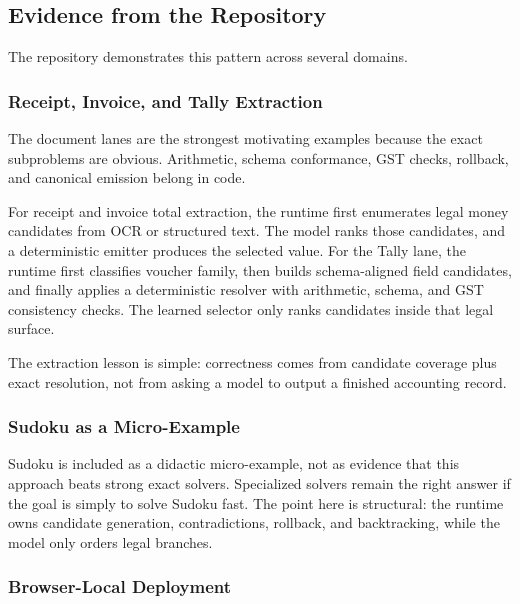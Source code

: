 \documentclass[
]{article}
\begin{document}
\subsection{Evidence from the
Repository}\label{evidence-from-the-repository}

The repository demonstrates this pattern across several domains.

\subsubsection{Receipt, Invoice, and Tally
Extraction}\label{receipt-invoice-and-tally-extraction}

The document lanes are the strongest motivating examples because the
exact subproblems are obvious. Arithmetic, schema conformance, GST
checks, rollback, and canonical emission belong in code.

For receipt and invoice total extraction, the runtime first enumerates
legal money candidates from OCR or structured text. The model ranks
those candidates, and a deterministic emitter produces the selected
value. For the Tally lane, the runtime first classifies voucher family,
then builds schema-aligned field candidates, and finally applies a
deterministic resolver with arithmetic, schema, and GST consistency
checks. The learned selector only ranks candidates inside that legal
surface.

The extraction lesson is simple: correctness comes from candidate
coverage plus exact resolution, not from asking a model to output a
finished accounting record.

\subsubsection{Sudoku as a
Micro-Example}\label{sudoku-as-a-micro-example}

Sudoku is included as a didactic micro-example, not as evidence that
this approach beats strong exact solvers. Specialized solvers remain the
right answer if the goal is simply to solve Sudoku fast. The point here
is structural: the runtime owns candidate generation, contradictions,
rollback, and backtracking, while the model only orders legal branches.

\subsubsection{Browser-Local Deployment}\label{browser-local-deployment}
\end{document}

